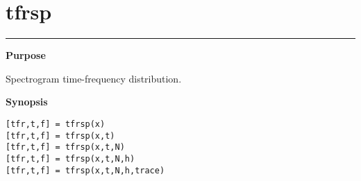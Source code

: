 

\section*{\hspace*{-1.6cm} tfrsp}

\vspace*{-.4cm}
\hspace*{-1.6cm}\rule[0in]{16.5cm}{.02cm}
\vspace*{.2cm}

{\bf \large \sf Purpose}\\
\hspace*{1.5cm}
\begin{minipage}[t]{13.5cm}
Spectrogram time-frequency distribution.
\end{minipage}
\vspace*{.5cm}

{\bf \large \sf Synopsis}\\
\hspace*{1.5cm}
\begin{minipage}[t]{13.5cm}
\begin{verbatim}
[tfr,t,f] = tfrsp(x)
[tfr,t,f] = tfrsp(x,t)
[tfr,t,f] = tfrsp(x,t,N)
[tfr,t,f] = tfrsp(x,t,N,h)
[tfr,t,f] = tfrsp(x,t,N,h,trace)
\end{verbatim}
\end{minipage}
\vspace*{.5cm}

